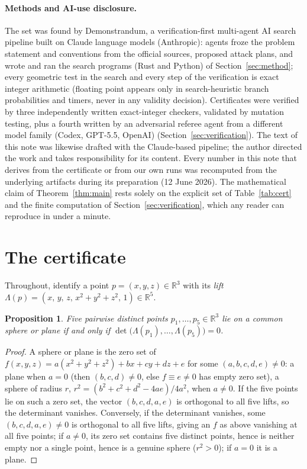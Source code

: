 \documentclass[10pt]{article}
\newtheorem{proposition}[theorem]{Proposition}
\theoremstyle{remark}
\newcommand{\R}{\mathbb{R}}
\begin{document}
\paragraph{Methods and AI-use disclosure.}
The set was found by Demonstrandum, a verification-first multi-agent AI
search pipeline built on Claude language models (Anthropic): agents froze the problem statement and
conventions from the official sources, proposed attack plans, and wrote and
ran the search programs (Rust and Python) of Section~\ref{sec:method}; every
geometric test in the search and every step of the verification is exact
integer arithmetic (floating point appears only in search-heuristic branch
probabilities and timers, never in any validity decision). Certificates
were verified by three independently written exact-integer checkers,
validated by mutation testing, plus a fourth written by an adversarial
referee agent from a different model family (Codex, GPT-5.5, OpenAI)
(Section~\ref{sec:verification}). The text of this note was likewise
drafted with the Claude-based pipeline; the author directed the work and
takes responsibility for its content. Every number in this note that derives
from the certificate or from our own runs was recomputed from the underlying
artifacts during its preparation (12 June 2026). The mathematical claim of Theorem~\ref{thm:main} rests
solely on the explicit set of Table~\ref{tab:cert} and the finite
computation of Section~\ref{sec:verification}, which any reader can
reproduce in under a minute.

\section{The certificate}\label{sec:cert}

Throughout, identify a point $p = (x,y,z) \in \R^3$ with its \emph{lift}
$\Lambda(p) = (x,\, y,\, z,\, x^2{+}y^2{+}z^2,\, 1) \in \R^5$.

\begin{proposition}\label{prop:det}
Five pairwise distinct points $p_1,\dots,p_5 \in \R^3$ lie on a common
sphere or plane if and only if
$\det\bigl(\Lambda(p_1),\dots,\Lambda(p_5)\bigr) = 0$.
\end{proposition}

\begin{proof}
A sphere or plane is the zero set of
$f(x,y,z) = a(x^2{+}y^2{+}z^2) + bx + cy + dz + e$ for some
$(a,b,c,d,e) \neq 0$: a plane when $a = 0$ (then $(b,c,d) \neq 0$, else
$f \equiv e \ne 0$ has empty zero set), a sphere of radius
$r$, $r^2 = (b^2{+}c^2{+}d^2{-}4ae)/4a^2$, when $a \neq 0$. If the five
points lie on such a zero set, the vector $(b,c,d,a,e)$ is orthogonal to all
five lifts, so the determinant vanishes. Conversely, if the determinant
vanishes, some $(b,c,d,a,e) \neq 0$ is orthogonal to all five lifts, giving
an $f$ as above vanishing at all five points; if $a \ne 0$, its zero set
contains five distinct points, hence is neither empty nor a single point,
hence is a genuine sphere ($r^2 > 0$); if $a = 0$ it is a plane.
\end{proof}
\end{document}
